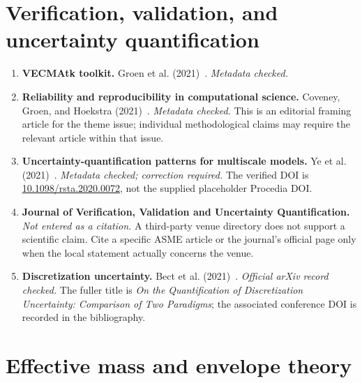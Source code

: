 \section{Verification, validation, and uncertainty quantification}

\begin{enumerate}
  \item \textbf{VECMAtk toolkit.}
    Groen et al. (2021)~\cite{groen2021vecmatk}. \emph{Metadata checked.}

  \item \textbf{Reliability and reproducibility in computational science.}
    Coveney, Groen, and Hoekstra (2021)~\cite{coveney2021reliability}.
    \emph{Metadata checked.} This is an editorial framing article for the theme
    issue; individual methodological claims may require the relevant article
    within that issue.

  \item \textbf{Uncertainty-quantification patterns for multiscale models.}
    Ye et al. (2021)~\cite{ye2021uqPatterns}. \emph{Metadata checked;
    correction required.} The verified DOI is
    \href{https://doi.org/10.1098/rsta.2020.0072}{10.1098/rsta.2020.0072}, not
    the supplied placeholder Procedia DOI.

  \item \textbf{Journal of Verification, Validation and Uncertainty
    Quantification.} \emph{Not entered as a citation.} A third-party venue
    directory does not support a scientific claim. Cite a specific ASME article
    or the journal's official page only when the local statement actually
    concerns the venue.

  \item \textbf{Discretization uncertainty.}
    Bect et al. (2021)~\cite{bect2021discretization}. \emph{Official arXiv
    record checked.} The fuller title is \emph{On the Quantification of
    Discretization Uncertainty: Comparison of Two Paradigms}; the associated
    conference DOI is recorded in the bibliography.
\end{enumerate}

\section{Effective mass and envelope theory}

